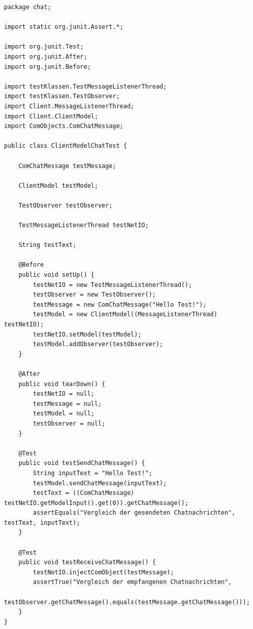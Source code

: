 \documentclass[twoside]{article}
\begin{document}
\begin{lstlisting}
package chat;

import static org.junit.Assert.*;

import org.junit.Test;
import org.junit.After;
import org.junit.Before;

import testKlassen.TestMessageListenerThread;
import testKlassen.TestObserver;
import Client.MessageListenerThread;
import Client.ClientModel;
import ComObjects.ComChatMessage;

public class ClientModelChatTest {

	ComChatMessage testMessage;
	
	ClientModel testModel;
	
	TestObserver testObserver;
	
	TestMessageListenerThread testNetIO;
	
	String testText;
	
	@Before  
    public void setUp() {
		testNetIO = new TestMessageListenerThread();
		testObserver = new TestObserver();
		testMessage = new ComChatMessage("Hello Test!");
		testModel = new ClientModel((MessageListenerThread) testNetIO);
		testNetIO.setModel(testModel);
		testModel.addObserver(testObserver);
    }  
  
    @After  
    public void tearDown() { 
    	testNetIO = null;
    	testMessage = null;
    	testModel = null;
    	testObserver = null;
    }  
	
	@Test
	public void testSendChatMessage() {
		String inputText = "Hello Test!";
		testModel.sendChatMessage(inputText);
		testText = ((ComChatMessage) testNetIO.getModelInput().get(0)).getChatMessage();
		assertEquals("Vergleich der gesendeten Chatnachrichten", testText, inputText);
	}
	
	@Test
	public void testReceiveChatMessage() {
		testNetIO.injectComObject(testMessage);
		assertTrue("Vergleich der empfangenen Chatnachrichten", 
				testObserver.getChatMessage().equals(testMessage.getChatMessage()));
	}
}
\end{lstlisting}
\end{document}
